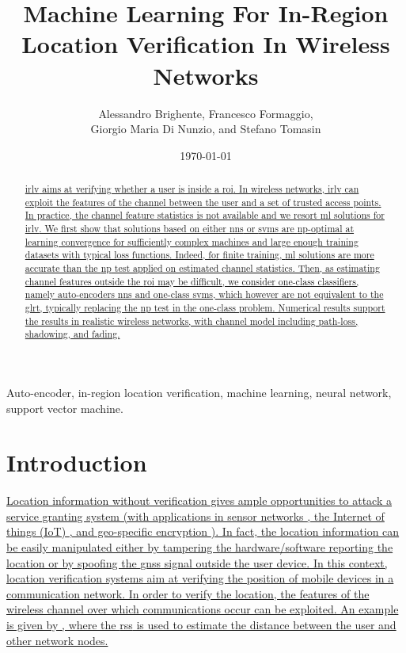 \documentclass[final,twocolumn]{IEEEtran}
\title{Machine Learning For In-Region Location Verification In Wireless Networks}
\author{Alessandro Brighente, Francesco Formaggio,\\  Giorgio Maria Di Nunzio, and  Stefano Tomasin }
\date{\today}
\begin{document}
\maketitle

\sloppy

\begin{abstract}
\uline{\Ac{irlv} aims at verifying whether a user is inside a \ac{roi}. In wireless networks, \ac{irlv} can exploit the features of the channel between the user and a set of trusted access points. In practice, the channel feature statistics is not available and we resort \ac{ml} solutions for \ac{irlv}. We first show that solutions based on either \acp{nn} or \acp{svm} are \ac{np}-optimal at learning convergence for sufficiently complex machines and large enough training datasets with typical loss functions. Indeed, for finite training, \ac{ml} solutions are more accurate than the \ac{np} test applied on estimated channel statistics. Then, as estimating channel features outside the \ac{roi} may be difficult, we consider one-class classifiers, namely auto-encoders \acp{nn} and one-class \acp{svm}, which however are not equivalent to the \acf{glrt},  typically replacing the \ac{np} test in the one-class problem.  Numerical results support the results in realistic \uline{wireless networks}, with channel model including path-loss, shadowing, and fading.}
\end{abstract}

\begin{IEEEkeywords}
Auto-encoder, in-region location verification, machine learning, neural network, support vector machine.
\end{IEEEkeywords}

\glsresetall
\section{Introduction}
\label{sec:intro}

\uline{Location information without verification gives ample opportunities to attack a service granting system (with  applications in sensor networks \mbox{\cite{Zeng-survey, 8376254, wei2013}}, the Internet of things (IoT) \cite{7903611}, and geo-specific encryption \cite{quaglia}). In fact, the location information can be easily manipulated either by tampering the hardware/software reporting the location or by spoofing the \ac{gnss} signal outside the user device. In this context, location verification systems aim at verifying the position of mobile devices in a communication network.  In order to verify the location, the features of the wireless channel over which communications occur can be exploited. An example is given by {\cite{li2010security}}, where the \ac{rss} is used to estimate the distance between the user and other network nodes.}
\end{document}
